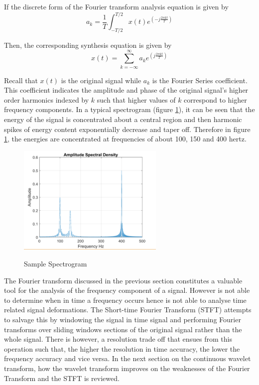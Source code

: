 If the discrete form of the Fourier transform analysis equation is given by
\begin{equation}
a_k=\frac{1}{T}\int_{-T/2}^{T/2}x(t)e^{\left(-j\frac{2\pi kt}{T}\right)}
\label{eqn_c4_fourier01}
\end{equation}

Then, the corresponding synthesis equation is given by
\begin{equation}
x(t)=\sum_{k=-\infty}^{\infty}a_ke^{\left(j\frac{2\pi kt}{T}\right)}
\label{eqn_c4_fourier02}
\end{equation}

Recall that $x(t)$ is the original signal while $a_k$ is the Fourier Series coefficient.  This coefficient indicates the amplitude and phase of the original signal's higher order harmonics indexed by $k$ such that higher values of $k$ correspond to higher frequency components.  In a typical spectrogram (figure \ref{fig_4_2_spectral}), it can be seen that the energy of the signal is concentrated about a central region and then harmonic spikes of energy content exponentially decrease and taper off.  Therefore in figure \ref{fig_4_2_spectral}, the energies are concentrated at frequencies of about 100, 150 and 400 hertz.
\begin{figure}
\centering
  \includegraphics[width=7cm]{thesis/images/spectral.png}\\
  \caption{Sample Spectrogram} \cite{xxx}\label{fig_4_2_spectral}
\end{figure}

The Fourier transform discussed in the previous section constitutes a valuable tool for the analysis of the frequency component of a signal.  However is not able to determine when in time a frequency occurs hence is not able to analyse time related signal deformations.  The Short-time Fourier Transform (STFT) attempts to salvage this by windowing the signal in time signal and performing Fourier transforms over sliding windows sections of the original signal rather than the whole signal.  There is however, a resolution trade off that ensues from this operation such that, the higher the resolution in time accuracy, the lower the frequency accuracy and vice versa.  In the next section on the continuous wavelet transform, how the wavelet transform improves on the weaknesses of the Fourier Transform and the STFT is reviewed.

